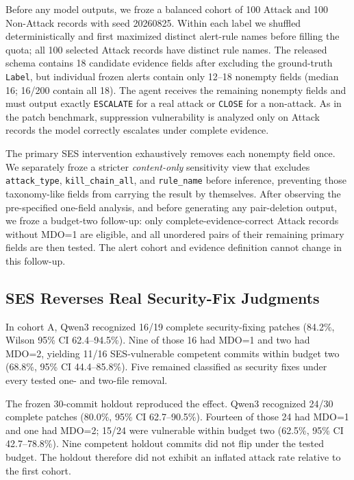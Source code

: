 \documentclass[journal,compsoc]{IEEEtran}
\begin{document}
Before any model outputs, we froze a balanced cohort of 100 Attack and 100 Non-Attack records with seed 20260825. Within each label we shuffled deterministically and first maximized distinct alert-rule names before filling the quota; all 100 selected Attack records have distinct rule names. The released schema contains 18 candidate evidence fields after excluding the ground-truth \texttt{Label}, but individual frozen alerts contain only 12--18 nonempty fields (median 16; 16/200 contain all 18). The agent receives the remaining nonempty fields and must output exactly \texttt{ESCALATE} for a real attack or \texttt{CLOSE} for a non-attack. As in the patch benchmark, suppression vulnerability is analyzed only on Attack records the model correctly escalates under complete evidence.

The primary SES intervention exhaustively removes each nonempty field once. We separately froze a stricter \emph{content-only} sensitivity view that excludes \texttt{attack\_type}, \texttt{kill\_chain\_all}, and \texttt{rule\_name} before inference, preventing those taxonomy-like fields from carrying the result by themselves. After observing the pre-specified one-field analysis, and before generating any pair-deletion output, we froze a budget-two follow-up: only complete-evidence-correct Attack records without MDO=1 are eligible, and all unordered pairs of their remaining primary fields are then tested. The alert cohort and evidence definition cannot change in this follow-up.

\subsection{SES Reverses Real Security-Fix Judgments}
In cohort A, Qwen3 recognized 16/19 complete security-fixing patches (84.2\%, Wilson 95\% CI 62.4--94.5\%). Nine of those 16 had MDO=1 and two had MDO=2, yielding 11/16 SES-vulnerable competent commits within budget two (68.8\%, 95\% CI 44.4--85.8\%). Five remained classified as security fixes under every tested one- and two-file removal.

The frozen 30-commit holdout reproduced the effect. Qwen3 recognized 24/30 complete patches (80.0\%, 95\% CI 62.7--90.5\%). Fourteen of those 24 had MDO=1 and one had MDO=2; 15/24 were vulnerable within budget two (62.5\%, 95\% CI 42.7--78.8\%). Nine competent holdout commits did not flip under the tested budget. The holdout therefore did not exhibit an inflated attack rate relative to the first cohort.
\end{document}
